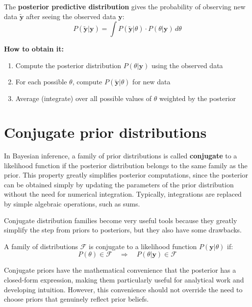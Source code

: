 The \textbf{posterior predictive distribution} gives the probability of observing new data $\tilde{\mathbf{y}}$ after seeing the observed data $\mathbf{y}$:
\begin{equation}\label{eq:posterior_predictive}
\boxed{P(\tilde{\mathbf{y}}|\mathbf{y}) = \int P(\tilde{\mathbf{y}}|\theta) \cdot P(\theta|\mathbf{y}) \, d\theta}
\end{equation}

\textbf{How to obtain it:}
\begin{enumerate}
\item Compute the posterior distribution $P(\theta|\mathbf{y})$ using the observed data
\item For each possible $\theta$, compute $P(\tilde{\mathbf{y}}|\theta)$ for new data
\item Average (integrate) over all possible values of $\theta$ weighted by the posterior
\end{enumerate}

\section{Conjugate prior distributions}

In Bayesian inference, a family of prior distributions is called \textbf{conjugate} to a likelihood function if the posterior distribution belongs to the same family as the prior. This property greatly simplifies posterior computations, since the posterior can be obtained simply by updating the parameters of the prior distribution without the need for numerical integration. Typically, integrations are replaced by simple algebraic operations, such as sums.

Conjugate distribution families become very useful tools because they greatly simplify the step from priors to posteriors, but they also have some drawbacks.

\begin{definition}
A family of distributions $\mathcal{F}$ is conjugate to a likelihood function $P(\mathbf{y}|\theta)$ if:
$$P(\theta) \in \mathcal{F} \quad \Rightarrow \quad P(\theta|\mathbf{y}) \in \mathcal{F}$$
\end{definition}

Conjugate priors have the mathematical convenience that the posterior has a closed-form expression, making them particularly useful for analytical work and developing intuition. However, this convenience should not override the need to choose priors that genuinely reflect prior beliefs.

